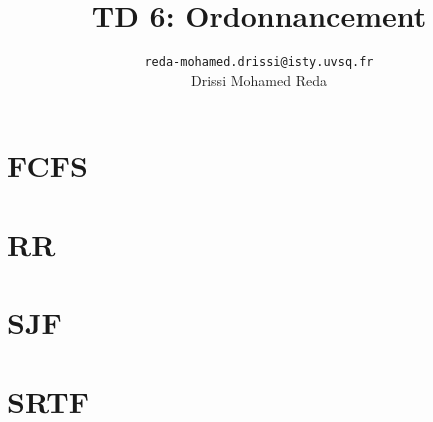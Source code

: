 \documentclass{article}
\author{
    \texttt{reda-mohamed.drissi@isty.uvsq.fr} \\
    Drissi Mohamed Reda}
\title{TD 6: Ordonnancement}
\begin{document}
\maketitle

\section{FCFS}



\section{RR}



\section{SJF}



\section{SRTF}


\end{document}
